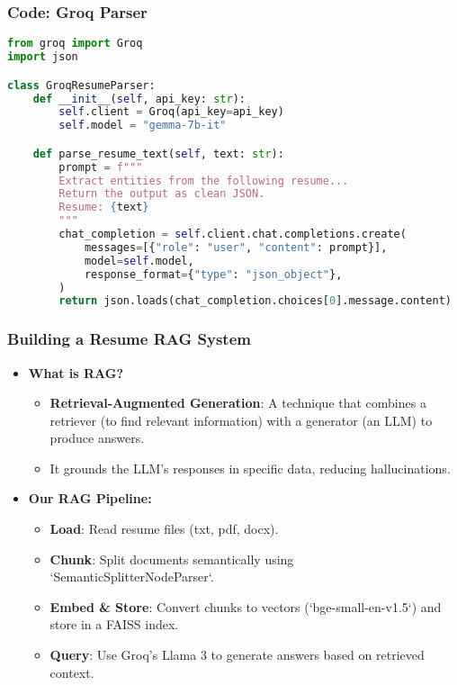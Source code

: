 \begin{frame}[fragile]\frametitle{Code: Groq Parser}
    \begin{lstlisting}[language=Python, caption={llm\_parsing\_groq.py}]
from groq import Groq
import json

class GroqResumeParser:
    def __init__(self, api_key: str):
        self.client = Groq(api_key=api_key)
        self.model = "gemma-7b-it"

    def parse_resume_text(self, text: str):
        prompt = f"""
        Extract entities from the following resume...
        Return the output as clean JSON.
        Resume: {text}
        """
        chat_completion = self.client.chat.completions.create(
            messages=[{"role": "user", "content": prompt}],
            model=self.model,
            response_format={"type": "json_object"},
        )
        return json.loads(chat_completion.choices[0].message.content)
    \end{lstlisting}
\end{frame}

\begin{frame}[fragile]\frametitle{Building a Resume RAG System}
    \begin{itemize}
        \item \textbf{What is RAG?}
        \begin{itemize}
            \item \textbf{Retrieval-Augmented Generation}: A technique that combines a retriever (to find relevant information) with a generator (an LLM) to produce answers.
            \item It grounds the LLM's responses in specific data, reducing hallucinations.
        \end{itemize}
        \item \textbf{Our RAG Pipeline:}
        \begin{itemize}
            \item \textbf{Load}: Read resume files (txt, pdf, docx).
            \item \textbf{Chunk}: Split documents semantically using `SemanticSplitterNodeParser`.
            \item \textbf{Embed \& Store}: Convert chunks to vectors (`bge-small-en-v1.5`) and store in a FAISS index.
            \item \textbf{Query}: Use Groq's Llama 3 to generate answers based on retrieved context.
        \end{itemize}
    \end{itemize}
\end{frame}

